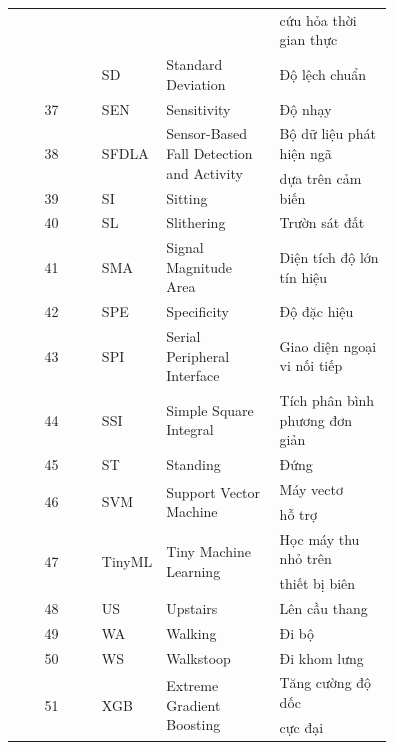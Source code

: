 \begin{longtable}{
        c
        p{0.15\linewidth}
        p{0.30\linewidth}
        p{0.30\linewidth}
    }
    \multirow{2}{*}{} & & & cứu hỏa thời gian thực\\
    36 & SD    & Standard Deviation              & Độ lệch chuẩn\\
    37 & SEN   & Sensitivity                     & Độ nhạy\\
    \multirow{2}{*}{38} & \multirow{2}{*}{SFDLA} & \multirow{2}{*}{Sensor-Based Fall Detection and Activity} & Bộ dữ liệu phát hiện ngã\\
    \multirow{2}{*}{} & & & \multirow{2}{*}{dựa trên cảm biến}\\
    39 & SI    & Sitting                         & Ngồi\\
    40 & SL    & Slithering                      & Trườn sát đất\\
    41 & SMA   & Signal Magnitude Area           & Diện tích độ lớn tín hiệu\\
    42 & SPE   & Specificity                     & Độ đặc hiệu\\
    43 & SPI   & Serial Peripheral Interface     & Giao diện ngoại vi nối tiếp\\
    44 & SSI   & Simple Square Integral          & Tích phân bình phương đơn giản\\
    45 & ST    & Standing                        & Đứng\\
    \multirow{2}{*}{46} & \multirow{2}{*}{SVM}  & \multirow{2}{*}{Support Vector Machine}         & Máy vectơ\\
    \multirow{2}{*}{} & & & hỗ trợ\\
    \multirow{2}{*}{47} & \multirow{2}{*}{TinyML} & \multirow{2}{*}{Tiny Machine Learning}        & Học máy thu nhỏ trên\\
    \multirow{2}{*}{} & & & thiết bị biên\\
    48 & US    & Upstairs                        & Lên cầu thang\\
    49 & WA    & Walking                         & Đi bộ\\
    50 & WS    & Walkstoop                       & Đi khom lưng\\
    \multirow{2}{*}{51} & \multirow{2}{*}{XGB}  & \multirow{2}{*}{Extreme Gradient Boosting}      & Tăng cường độ dốc\\
    \multirow{2}{*}{} & & & cực đại\\

\end{longtable}